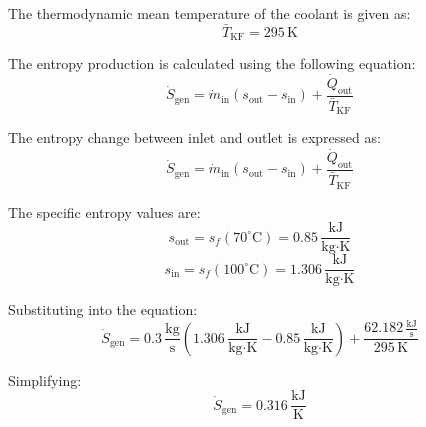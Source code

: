 The thermodynamic mean temperature of the coolant is given as:  
\[
\bar{T}_{\text{KF}} = 295 \, \text{K}
\]

The entropy production is calculated using the following equation:  
\[
\dot{S}_{\text{gen}} = \dot{m}_{\text{in}} (s_{\text{out}} - s_{\text{in}}) + \frac{\dot{Q}_{\text{out}}}{\bar{T}_{\text{KF}}}
\]

The entropy change between inlet and outlet is expressed as:  
\[
\dot{S}_{\text{gen}} = \dot{m}_{\text{in}} (s_{\text{out}} - s_{\text{in}}) + \frac{\dot{Q}_{\text{out}}}{\bar{T}_{\text{KF}}}
\]

The specific entropy values are:  
\[
s_{\text{out}} = s_f (70^\circ\text{C}) = 0.85 \, \frac{\text{kJ}}{\text{kg·K}}
\]
\[
s_{\text{in}} = s_f (100^\circ\text{C}) = 1.306 \, \frac{\text{kJ}}{\text{kg·K}}
\]

Substituting into the equation:  
\[
\dot{S}_{\text{gen}} = 0.3 \, \frac{\text{kg}}{\text{s}} \left( 1.306 \, \frac{\text{kJ}}{\text{kg·K}} - 0.85 \, \frac{\text{kJ}}{\text{kg·K}} \right) + \frac{62.182 \, \frac{\text{kJ}}{\text{s}}}{295 \, \text{K}}
\]

Simplifying:  
\[
\dot{S}_{\text{gen}} = 0.316 \, \frac{\text{kJ}}{\text{K}}
\]